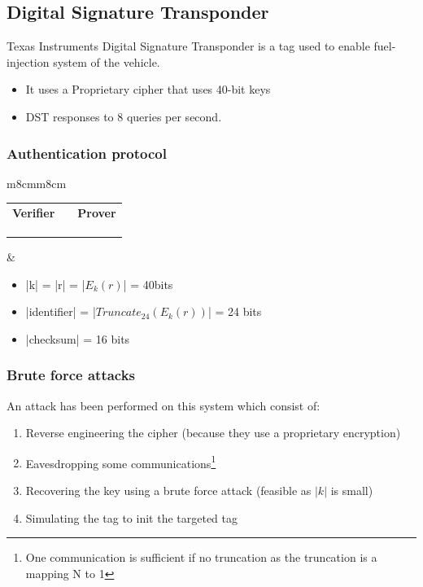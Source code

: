 \subsection{Digital Signature Transponder}


Texas Instruments Digital Signature Transponder is a tag used to enable 
fuel-injection system of the vehicle.
\begin{itemize}
	\item It uses a Proprietary cipher that uses 40-bit keys
	\item DST responses to 8 queries per second.
\end{itemize}

\subsubsection{Authentication protocol}
\begin{tabular}{m{8cm}m{8cm}}
    \begin{tabular}{ccc}
        \bf Verifier & &\bf  Prover \\
                 &\fr{r} & \\
        \\
        & \fl{id, $Trunc_{24}(E_k(r))$, checksum} \\
    \end{tabular}
    &
    \begin{itemize}
        \item |k| = |r| = |$E_k(r)$| = 40bits
        \item |identifier| = |$Truncate_{24}(E_k(r))$| = 24 bits
        \item |checksum| = 16 bits
    \end{itemize}
\end{tabular}

\subsubsection{Brute force attacks}
An attack has been performed on this system which consist of:
\begin{enumerate}
    \item Reverse engineering the cipher (because they use a proprietary
        encryption)
	\item Eavesdropping some communications\footnote{One communication is
    sufficient if no truncation as the truncation is a mapping N to 1}
	\item Recovering the key using a brute force attack (feasible as $|k|$ is small)
	\item Simulating the tag to init the targeted tag
\end{enumerate}

